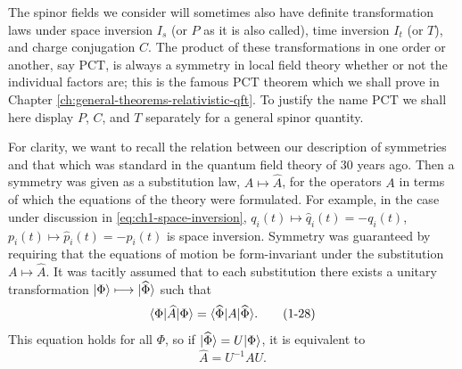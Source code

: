 The spinor fields we consider will sometimes also have definite
transformation laws under space inversion $I_s$ (or $P$ as it is also
called), time inversion $I_t$ (or $T$), and charge conjugation $C$. The
product of these transformations in one order or another, say $\mathrm{PCT}$,
is always a symmetry in local field theory whether or not the individual
factors are; this is the famous $\mathrm{PCT}$ theorem which we shall prove
in Chapter \ref{ch:general-theorems-relativistic-qft}. To justify the name $\mathrm{PCT}$ we shall here display $P$,
$C$, and $T$ separately for a general spinor quantity.

For clarity, we want to recall the relation between our description of
symmetries and that which was standard in the quantum field theory of 30 years
ago. Then a symmetry was given as a substitution law, $A\longmapsto\widehat A$,
for the operators $A$ in terms of which the equations of the theory were
formulated. For example, in the case under discussion in \eqref{eq:ch1-space-inversion},
$q_i(t)\longmapsto\widehat q_i(t)=-q_i(t)$,
$p_i(t)\longmapsto\widehat p_i(t)=-p_i(t)$ is space inversion. Symmetry was
guaranteed by requiring that the equations of motion be form-invariant under
the substitution $A\longmapsto\widehat A$. It was tacitly assumed that to each
substitution there exists a unitary transformation
$\lvert \Phi\rangle\longmapsto\lvert \widehat\Phi\rangle$ such that
\begin{equation}
  \langle \Phi\rvert\widehat A\lvert \Phi\rangle
  =\langle \widehat\Phi\rvert A\lvert \widehat\Phi\rangle.
  \tag{1-28}\label{eq:ch1-unitary-symmetry-inner-product}
\end{equation}
This equation holds for all $\Phi$, so if
$\lvert \widehat\Phi\rangle=U\lvert \Phi\rangle$, it is equivalent to
\begin{equation}
  \widehat A=U^{-1}AU .
  \tag{1-29}\label{eq:ch1-unitary-substitution}
\end{equation}

